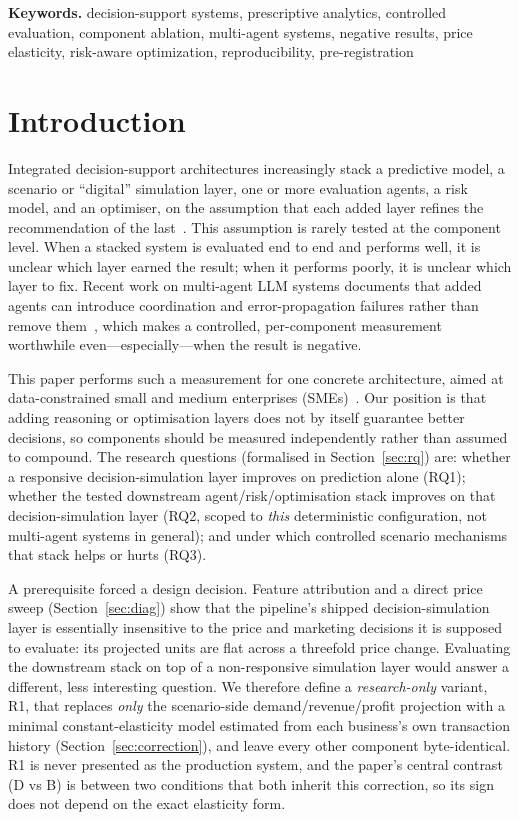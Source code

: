 \documentclass[10pt,twocolumn,a4paper]{article}
\begin{document}
\medskip\noindent\textbf{Keywords.} decision-support systems, prescriptive analytics, controlled evaluation,
component ablation, multi-agent systems, negative results, price elasticity,
risk-aware optimization, reproducibility, pre-registration
\section{Introduction}
Integrated decision-support architectures increasingly stack a predictive model,
a scenario or ``digital'' simulation layer, one or more evaluation agents, a
risk model, and an optimiser, on the assumption that each added layer refines
the recommendation of the last~\cite{Lepenioti2020,Arnott2014}. This assumption
is rarely tested at the component level. When a stacked system is evaluated end
to end and performs well, it is unclear which layer earned the result; when it
performs poorly, it is unclear which layer to fix. Recent work on multi-agent
LLM systems documents that added agents can introduce coordination and
error-propagation failures rather than remove
them~\cite{Wang2024,Smit2024,Huang2024,Cemri2025}, which makes a controlled,
per-component measurement worthwhile even---especially---when the result is
negative.

This paper performs such a measurement for one concrete architecture, aimed at
data-constrained small and medium enterprises (SMEs)~\cite{OECD2021,Buteau2021}.
Our position is that adding reasoning or optimisation layers does not by itself
guarantee better decisions, so components should be measured independently rather
than assumed to compound. The research questions (formalised in
Section~\ref{sec:rq}) are: whether a responsive decision-simulation layer
improves on prediction alone (RQ1); whether the tested downstream
agent/risk/optimisation stack improves on that decision-simulation layer (RQ2,
scoped to \emph{this} deterministic configuration, not multi-agent systems in
general); and under which controlled scenario mechanisms that stack helps or
hurts (RQ3).

A prerequisite forced a design decision. Feature attribution and a direct price
sweep (Section~\ref{sec:diag}) show that the pipeline's shipped
decision-simulation layer is essentially insensitive to the price and marketing
decisions it is supposed to evaluate: its projected units are flat across a
threefold price change. Evaluating the downstream stack on top of a
non-responsive simulation layer would answer a different, less interesting
question. We therefore define a \emph{research-only} variant, R1, that replaces
\emph{only} the scenario-side demand/revenue/profit projection with a minimal
constant-elasticity model estimated from each business's own transaction history
(Section~\ref{sec:correction}), and leave every other component byte-identical.
R1 is never presented as the production system, and the paper's central contrast
(D vs B) is between two conditions that both inherit this correction, so its sign
does not depend on the exact elasticity form.
\end{document}
